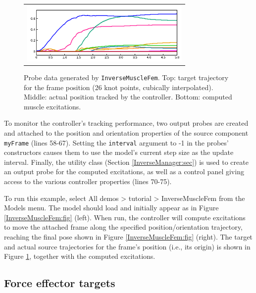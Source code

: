 \begin{figure}[h]
\begin{center}
\begin{tabular}{c}
      \includegraphics[width=3.25in]{images/InverseMuscleFemEx}
   \fi
\end{tabular}
\end{center}
\caption{Probe data generated by {\tt InverseMuscleFem}. Top:
target trajectory for the frame position (26 knot points, cubically
interpolated). Middle: actual position tracked by the controller.
Bottom: computed muscle excitations.}
\label{InverseMuscleFemProbes:fig}
\end{figure}

To monitor the controller's tracking performance, two output probes are created
and attached to the {\sf position} and {\sf orientation} properties of the
source component {\tt myFrame} (lines 58-67). Setting the {\tt interval}
argument to -1 in the probes' constructors causes them to use the model's
current step size as the update interval. Finally, the utility class
 (Section \ref{InverseManager:sec}) 
is used to create an output probe for the computed excitations, as well as a
control panel giving access to the various controller properties (lines 70-75).

To run this example, select {\sf All demos > tutorial > InverseMuscleFem} from
the {\sf Models} menu. The model should load and initially appear as in Figure
\ref{InverseMuscleFem:fig} (left). When run, 
the controller will compute excitations to move the attached frame along the
specified position/orientation trajectory, reaching the final pose shown in
Figure \ref{InverseMuscleFem:fig} (right). The target and actual source
trajectories for the frame's position (i.e., its origin) is shown in Figure
\ref{InverseMuscleFemProbes:fig}, together with the computed excitations.

\subsection{Force effector targets}

